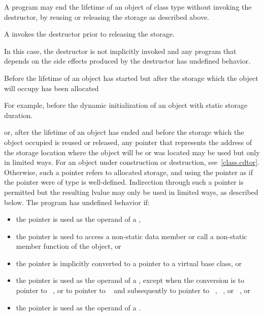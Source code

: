 \pnum
A program may end the lifetime of an object of class type without invoking the
destructor, by reusing or releasing the storage as described above.
\begin{note}
A  invokes the destructor
prior to releasing the storage.
\end{note}
In this case, the destructor is not implicitly invoked and any program that
depends on the side effects produced by the destructor has undefined behavior.

\pnum
Before the lifetime of an object has started but after the storage which
the object will occupy has been allocated
\begin{footnote}
For example, before the dynamic initialization of
an object with static storage duration.

\end{footnote}
or, after the lifetime of an object has ended and before the storage
which the object occupied is reused or released, any pointer that represents the address of
the storage location where the object will be or was located may be
used but only in limited ways.
For an object under construction or destruction, see~\ref{class.cdtor}.
Otherwise, such
a pointer refers to allocated
storage, and using the pointer as
if the pointer were of type  is
well-defined. Indirection through such a pointer is permitted but the resulting lvalue may only be used in
limited ways, as described below. The
program has undefined behavior if:
\begin{itemize}
\item
  the pointer is used as the operand of a ,
\item
  the pointer is used to access a non-static data member or call a
  non-static member function of the object, or
\item
  the pointer is implicitly converted to a pointer
  to a virtual base class, or
\item
  the pointer is used as the operand of a
  , except when the conversion
  is to pointer to \cv{}~, or to pointer to \cv{}~
  and subsequently to pointer to
  \cv{}~,
  \cv{}~, or
  \cv{}~, or
\item
  the pointer is used as the operand of a
  .
\end{itemize}
